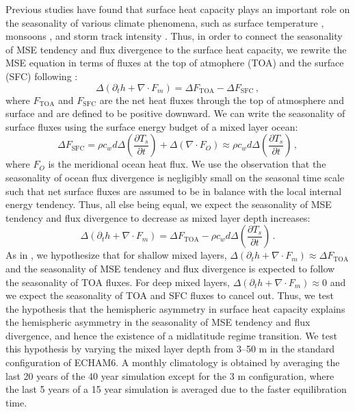 \documentclass{ametsocV5}
\begin{document}
  Previous studies have found that surface heat capacity plays an important role on the seasonality of various climate phenomena, such as surface temperature \citep{donohoe2013a}, monsoons \citep{bordoni2008}, and storm track intensity \citep{barpanda2020}. Thus, in order to connect the seasonality of MSE tendency and flux divergence to the surface heat capacity, we rewrite the MSE equation in terms of fluxes at the top of atmophere (TOA) and the surface (SFC) following \cite{barpanda2020}:
  \begin{equation}\label{eq:mse-toasfc}
    \Delta\left(\partial_t h + \nabla\cdot F_{m} \right) = \Delta F_{\mathrm{TOA}} - \Delta F_{\mathrm{SFC}} \, ,
  \end{equation}
  where \(F_{\mathrm{TOA}}\) and \(F_{\mathrm{SFC}}\) are the net heat fluxes through the top of atmosphere and surface and are defined to be positive downward. We can write the seasonality of surface fluxes using the surface energy budget of a mixed layer ocean:
  \begin{equation}
    \Delta F_{\mathrm{SFC}} = \rho c_{w} d \Delta\left(\frac{\partial T_{s}}{\partial t}\right) + \Delta ( \nabla\cdot F_{O}) \approx \rho c_{w} d \Delta\left(\frac{\partial T_{s}}{\partial t}\right) \, ,
  \end{equation}
  where $F_O$ is the meridional ocean heat flux. We use the observation that the seasonality of ocean flux divergence is negligibly small on the seasonal time scale \citep{roberts2017} such that net surface fluxes are assumed to be in balance with the local internal energy tendency. Thus, all else being equal, we expect the seasonality of MSE tendency and flux divergence to decrease as mixed layer depth increases:
  \begin{equation}\label{eq:mse-toasfc-approx}
    \Delta\left(\partial_t h + \nabla\cdot F_{m} \right) = \Delta F_{\mathrm{TOA}} - \rho c_{w} d \Delta\left(\frac{\partial T_{s}}{\partial t}\right) \, .
  \end{equation}
  As in \cite{barpanda2020}, we hypothesize that for shallow mixed layers, $\Delta\left(\partial_t h + \nabla\cdot F_{m} \right) \approx \Delta F_{\mathrm{TOA}}$ and the seasonality of MSE tendency and flux divergence is expected to follow the seasonality of TOA fluxes. For deep mixed layers, $\Delta\left(\partial_t h + \nabla\cdot F_{m} \right) \approx 0$ and we expect the seasonality of TOA and SFC fluxes to cancel out. Thus, we test the hypothesis that the hemispheric asymmetry in surface heat capacity explains the hemispheric asymmetry in the seasonality of MSE tendency and flux divergence, and hence the existence of a midlatitude regime transition. We test this hypothesis by varying the mixed layer depth from 3--50 m in the standard configuration of ECHAM6. A monthly climatology is obtained by averaging the last 20 years of the 40 year simulation except for the 3 m configuration, where the last 5 years of a 15 year simulation is averaged due to the faster equilibration time.
  
\end{document}
